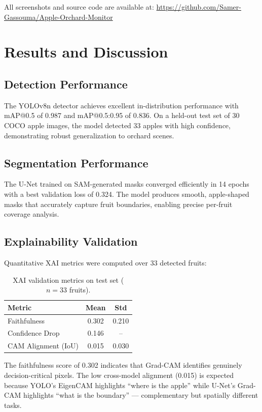 \documentclass[12pt,a4paper]{article}
\begin{document}
All screenshots and source code are available at: \url{https://github.com/Samer-Gassouma/Apple-Orchard-Monitor}

\section{Results and Discussion}

\subsection{Detection Performance}

The YOLOv8n detector achieves excellent in-distribution performance with mAP@0.5 of 0.987 and mAP@0.5:0.95 of 0.836. On a held-out test set of 30 COCO apple images, the model detected 33 apples with high confidence, demonstrating robust generalization to orchard scenes.

\subsection{Segmentation Performance}

The U-Net trained on SAM-generated masks converged efficiently in 14 epochs with a best validation loss of 0.324. The model produces smooth, apple-shaped masks that accurately capture fruit boundaries, enabling precise per-fruit coverage analysis.

\subsection{Explainability Validation}

Quantitative XAI metrics were computed over 33 detected fruits:

\begin{table}[h]
\centering
\begin{tabular}{lcc}
\toprule
\textbf{Metric} & \textbf{Mean} & \textbf{Std} \\
\midrule
Faithfulness & 0.302 & 0.210 \\
Confidence Drop & 0.146 & -- \\
CAM Alignment (IoU) & 0.015 & 0.030 \\
\bottomrule
\end{tabular}
\caption{XAI validation metrics on test set ($n=33$ fruits).}
\end{table}

The faithfulness score of 0.302 indicates that Grad-CAM identifies genuinely decision-critical pixels. The low cross-model alignment (0.015) is expected because YOLO's EigenCAM highlights ``where is the apple'' while U-Net's Grad-CAM highlights ``what is the boundary'' --- complementary but spatially different tasks.
\end{document}
